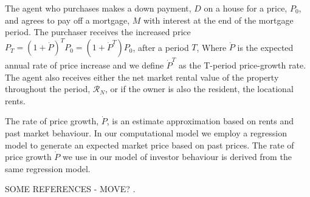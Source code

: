 The agent who purchases makes a down payment, $D$ on a house for a price, $P_0$, and agrees to pay off a mortgage, $M$ with interest at the end of the mortgage period.  The purchaser  receives the increased price $P_T = (1 + \dot P)^TP_0 = (1+\dot P^T)P_0$, after a period $T$, Where $\dot P$ is the expected annual rate of price increase and we define $\dot P^T$ as the T-period  price-growth rate. The agent also receives either the net market rental value of the property throughout the period, $\mathcal{R}_N$, or if the owner is also the resident, the locational rents. 
 



The rate of price growth, $\dot P$, is an estimate approximation based on rents and past market behaviour. In our computational model we employ a regression model to generate an \gls{expected market price} based on past prices. The rate of price growth $\dot P$ we use in our model of investor behaviour is derived from the same regression model.

SOME REFERENCES - MOVE? \cite{anselinModernSpatialEconometrics2014, gelmanDataAnalysisUsing2006}.

